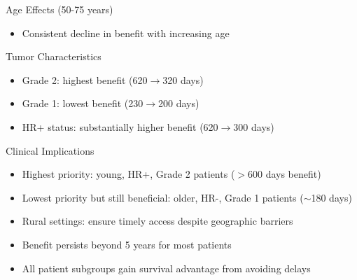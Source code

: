 \documentclass{beamer}
\begin{document}
    \begin{frame}{}
    
   
    
    \begin{block}{Age Effects (50-75 years)}
    \begin{itemize}
    \item Consistent decline in benefit with increasing age
    \end{itemize}
    \end{block}
    
    \begin{block}{Tumor Characteristics}
    \begin{itemize}
    \item Grade 2: highest benefit (620$\rightarrow$320 days)
    \item Grade 1: lowest benefit (230$\rightarrow$200 days)
    \item HR+ status: substantially higher benefit (620$\rightarrow$300 days)
    \end{itemize}
    \end{block}
    
    \begin{block}{Clinical Implications}
    \begin{itemize}
    \item Highest priority: young, HR+, Grade 2 patients ($>$600 days benefit)
    \item Lowest priority but still beneficial: older, HR-, Grade 1 patients ($\sim$180 days)
    \item Rural settings: ensure timely access despite geographic barriers
    \item Benefit persists beyond 5 years for most patients
    \item All patient subgroups gain survival advantage from avoiding delays
    \end{itemize}
    \end{block}
    
   
    \end{frame}
\end{document}
